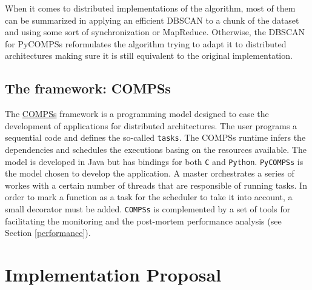 \documentclass[10pt,journal,compsoc]{IEEEtran}
\begin{document}
When it comes to distributed implementations of the algorithm, most of them can be summarized in applying an efficient DBSCAN to a chunk of the dataset and using some sort of synchronization or MapReduce. Otherwise, the DBSCAN for PyCOMPSs reformulates the algorithm trying to adapt it to distributed architectures making sure it is still equivalent to the original implementation.

\subsection{The framework: COMPSs} \label{subec:compss_framework}


The \href{https://www.bsc.es/research-and-development/software-and-apps/software-list/comp-superscalar}{COMPSs} framework\cite{compss} is a programming model designed to ease the development of applications for distributed architectures. The user programs a sequential code and defines the so-called \texttt{tasks}. The COMPSs runtime infers the dependencies and schedules the executions basing on the resources available. The model is developed in Java but has bindings for both \texttt{C} and \texttt{Python}. \texttt{PyCOMPSs}\cite{pycompss} is the model chosen to develop the application. A master orchestrates a series of workes with a certain number of threads that are responsible of running tasks. In order to mark a function as a task for the scheduler to take it into account, a small decorator must be added. \texttt{COMPSs} is complemented by a set of tools for facilitating the monitoring and the post-mortem performance analysis (see Section \ref{performance}).



\section{Implementation Proposal} \label{sec:implementation}

\end{document}
